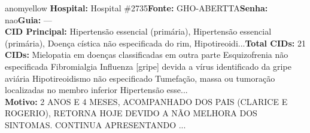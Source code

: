 \documentclass[a4paper,10pt]{article}
\begin{document}
\begin{anomalycard}[Interna\c{c}\~{a}o \#7480 | Pac. \#6240 | MODERADO (z=2.09) | LOS: 4d | 21/02/2026\,$\to$\,25/02/2026]{anomyellow}
\textbf{Hospital:} Hospital \#2735\quad \textbf{Fonte:} GHO-ABERTTA\quad \textbf{Senha:} nao\quad \textbf{Guia:} ---\\

\textbf{CID Principal:} {\small Hipertensão essencial (primária), Hipertensão essencial (primária), Doença cística não especificada do rim, Hipotireoidi...}\quad\textbf{Total CIDs:} 21\\

\textbf{CIDs:} {\scriptsize Mielopatia em doenças classificadas em outra parte \textbar{} Esquizofrenia não especificada \textbar{} Fibromialgia \textbar{} Influenza [gripe] devida a vírus identificado da gripe aviária \textbar{} Hipotireoidismo não especificado \textbar{} Tumefação, massa ou tumoração localizadas no membro inferior \textbar{} Hipertensão esse...}\\

\textbf{Motivo:} {\scriptsize 2 ANOS E 4 MESES, ACOMPANHADO DOS PAIS (CLARICE E ROGERIO), RETORNA HOJE DEVIDO A NÃO MELHORA DOS SINTOMAS. CONTINUA APRESENTANDO ...}\\




\end{anomalycard}
\end{document}
